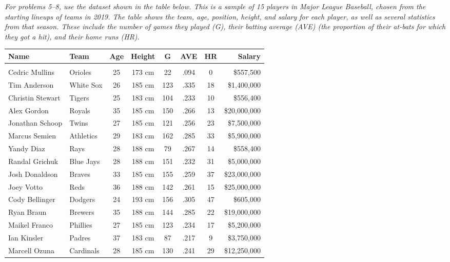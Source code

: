 \emph{For problems 5--8, use the dataset shown in the table below.  This is a sample of 15 players in Major League Baseball, chosen from the starting lineups of teams in 2019.  The table shows the team, age, position, height, and salary for each player, as well as several statistics from that season.  These include the number of games they played (G), their batting average (AVE) (the proportion of their at-bats for which they got a hit), and their home runs (HR).}
\begin{center}
{\footnotesize
\begin{tabular}{l l c c c c c r}
\textbf{Name} & \textbf{Team} & \textbf{Age} & \textbf{Height} & \textbf{G} & \textbf{AVE} & \textbf{HR} & \textbf{Salary}\\
\hline
& & & & & & & \\
Cedric Mullins & Orioles & 25 & 173 cm & 22 & .094 & 0 & \$557,500\\
Tim Anderson & White Sox & 26 & 185 cm & 123 & .335 & 18 & \$1,400,000\\
Christin Stewart & Tigers & 25 & 183 cm & 104 & .233 & 10 & \$556,400\\
Alex Gordon & Royals & 35 & 185 cm & 150 & .266 & 13 & \$20,000,000\\
Jonathan Schoop & Twins & 27 & 185 cm & 121 & .256 & 23 & \$7,500,000\\
Marcus Semien & Athletics & 29 & 183 cm & 162 & .285 & 33 & \$5,900,000\\
Yandy Diaz & Rays & 28 & 188 cm & 79 & .267 & 14 & \$558,400\\
Randal Grichuk & Blue Jays & 28 & 188 cm & 151 & .232 & 31 & \$5,000,000\\
Josh Donaldson & Braves & 33 & 185 cm & 155 & .259 & 37 & \$23,000,000\\
Joey Votto & Reds & 36 & 188 cm & 142 & .261 & 15 & \$25,000,000\\
Cody Bellinger & Dodgers & 24 & 193 cm & 156 & .305 & 47 & \$605,000\\
Ryan Braun & Brewers & 35 & 188 cm & 144 & .285 & 22 & \$19,000,000\\
Maikel Franco & Phillies & 27 & 185 cm & 123 & .234 & 17 & \$5,200,000\\
Ian Kinsler & Padres & 37 & 183 cm & 87 & .217 & 9 & \$3,750,000\\
Marcell Ozuna & Cardinals & 28 & 185 cm & 130 & .241 & 29 & \$12,250,000\\
\end{tabular}}
\end{center}

